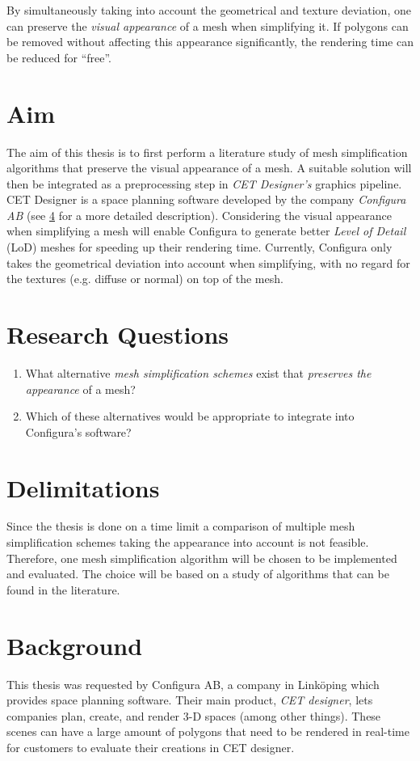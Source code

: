 By simultaneously taking into account the geometrical and texture deviation, one can preserve the \emph{visual appearance} of a mesh when simplifying it. If polygons can be removed without affecting this appearance significantly, the rendering time can be reduced for ``free''.

\section{Aim} \label{sec:aim}
The aim of this thesis is to first perform a literature study of mesh simplification algorithms that preserve the visual appearance of a mesh. A suitable solution will then be integrated as a preprocessing step in \emph{CET Designer's} graphics pipeline. CET Designer is a space planning software developed by the company \emph{Configura AB} (see \cref{sec:background} for a more detailed description). Considering the visual appearance when simplifying a mesh will enable Configura to generate better \emph{Level of Detail} (LoD) meshes for speeding up their rendering time. Currently, Configura only takes the geometrical deviation into account when simplifying, with no regard for the textures (e.g. diffuse or normal) on top of the mesh.


\section{Research Questions} \label{sec:research-questions}
\begin{enumerate}
\item What alternative \emph{mesh simplification schemes} exist that \emph{preserves the appearance} of a mesh? 
\item Which of these alternatives would be appropriate to integrate into Configura's software?
\end{enumerate}

\section{Delimitations} \label{sec:delimitations}
Since the thesis is done on a time limit a comparison of multiple mesh simplification schemes taking the appearance into account is not feasible. Therefore, one mesh simplification algorithm will be chosen to be implemented and evaluated. The choice will be based on a study of algorithms that can be found in the literature.

\section{Background} \label{sec:background}
This thesis was requested by Configura AB, a company in Linköping which provides space planning software. Their main product, \emph{CET designer}, lets companies plan, create, and render 3-D spaces (among other things). These scenes can have a large amount of polygons that need to be rendered in real-time for customers to evaluate their creations in CET designer. 

